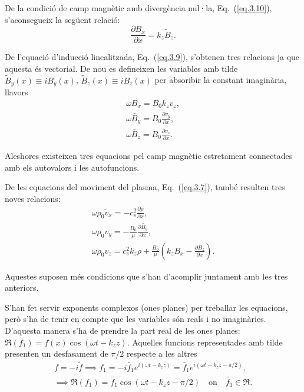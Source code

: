 De la condició de camp magnètic amb divergència nul·la, Eq.~(\ref{eq.3.10}), s'aconsegueix la següent relació:
\begin{equation}
	\frac{\partial B_{x}}{\partial x} = k_z \tilde{B}_{z}. \tag{3.22} \label{eq.3.22}
\end{equation}

De l'equació d'inducció linealitzada, Eq.~(\ref{eq.3.9}), s'obtenen tres relacions ja que aquesta és vectorial.
De nou es defineixen les variables amb tilde ${\tilde{B}_{y}}(x) \equiv i {B}_{y}(x)$, ${\tilde{B}_{z}}(x) \equiv i {B}_{z}(x)$ per absoribir la constant imaginària, llavors
\begin{gather}
	\omega B_{x} = B_0 k_z v_{z}, \tag{3.23} \label{eq.3.23} \\
	\omega \tilde{B_{y}} = B_0 \frac{\partial v_{y}}{\partial x}, \tag{3.24} \label{eq.3.24} \\
	\omega \tilde{B_{z}} = B_0 \frac{\partial v_{z}}{\partial x}. \tag{3.25} \label{eq.3.25}
\end{gather}

Aleshores existeixen tres equacions pel camp magnètic estretament connectades amb els autovalors i les autofuncions.

De les equacions del moviment del plasma, Eq.~(\ref{eq.3.7}), també resulten tres noves relacions:
\begin{gather}
	\omega \rho_0 \tilde{v}_{x} = - c_s^2 \frac{\partial \rho}{\partial x}, \tag{3.26} \label{eq.3.26} \\
	\omega \rho_0 v_{y} = - \frac{B_0}{\mu} \frac{\partial \tilde{B_{y}}}{\partial x}, \tag{3.27} \label{eq.3.27} \\
	\omega \rho_0 v_{z} = c_s^2 k_z \rho + \frac{B_0}{\mu} \left( k_z B_{x} - \frac{\partial \tilde{B_{z}}}{\partial x} \right). \tag{3.28} \label{eq.3.28}
\end{gather}

Aquestes suposen més condicions que s'han d'acomplir juntament amb les tres anteriors.

S'han fet servir exponents complexos (ones planes) per treballar les equacions,
però s'ha de tenir en compte que les variables són reals i no imaginàries.
D'aquesta manera s'ha de prendre la part real de les ones planes: $\Re(f_1) = f (x) \cos(\omega t - k_z z)$.
Aquelles funcions representades amb tilde presenten un desfasament de $\pi /2$ respecte a les altres
\begin{align*}
	f = - i \tilde{f} \implies f_1 = - i \tilde{f_1} e^{i(\omega t - k_z z)} = \tilde{f_1} e^{i(\omega t - k_z z - \pi /2)}, \\
	\implies \Re(f_1) = \tilde{f_1} \cos(\omega t - k_z z - \pi / 2) \quad \text{on} \quad \tilde{f_1} \in \Re.
\end{align*}

